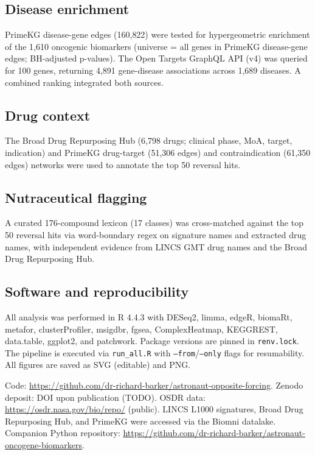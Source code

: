 \documentclass[pdflatex,sn-nature]{sn-jnl}
\begin{document}
\subsection{Disease enrichment}
PrimeKG disease-gene edges (160{,}822) \cite{chandrasekharan2023} were tested for
hypergeometric enrichment of the 1{,}610 oncogenic biomarkers (universe = all genes
in PrimeKG disease-gene edges; BH-adjusted p-values). The Open Targets GraphQL API
(v4) \cite{ochoa2023} was queried for 100 genes, returning 4{,}891 gene-disease
associations across 1{,}689 diseases. A combined ranking integrated both sources.

\subsection{Drug context}
The Broad Drug Repurposing Hub (6{,}798 drugs; clinical phase, MoA, target,
indication) and PrimeKG drug-target (51{,}306 edges) and contraindication (61{,}350
edges) networks were used to annotate the top 50 reversal hits.

\subsection{Nutraceutical flagging}
A curated 176-compound lexicon (17 classes) was cross-matched against the top 50
reversal hits via word-boundary regex on signature names and extracted drug names,
with independent evidence from LINCS GMT drug names and the Broad Drug Repurposing
Hub.

\subsection{Software and reproducibility}
All analysis was performed in R 4.4.3 with DESeq2, limma, edgeR, biomaRt, metafor,
clusterProfiler, msigdbr, fgsea, ComplexHeatmap, KEGGREST, data.table, ggplot2, and
patchwork. Package versions are pinned in \texttt{renv.lock}. The pipeline is
executed via \texttt{run\_all.R} with \texttt{--from}/\texttt{--only} flags for
resumability. All figures are saved as SVG (editable) and PNG.

\backmatter

Code: \url{https://github.com/dr-richard-barker/astronaut-opposite-forcing}.
Zenodo deposit: DOI upon publication (TODO). OSDR data:
\url{https://osdr.nasa.gov/bio/repo/} (public). LINCS L1000 signatures, Broad Drug
Repurposing Hub, and PrimeKG were accessed via the Biomni datalake. Companion Python
repository: \url{https://github.com/dr-richard-barker/astronaut-oncogene-biomarkers}.


\end{document}
